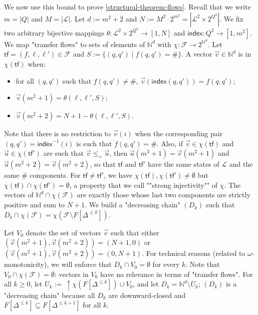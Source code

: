 \documentclass[10pt,a4paper]{article}
\let\mathbb\mathds
\renewcommand{\geq}{\geqslant}
\renewcommand{\leq}{\leqslant}
\newcommand{\nats}{\mathbb{N}}
\newcommand{\set}[1]{\{#1\}}
\newcommand{\nset}[2]{[#1,#2]}
\newcommand{\deff}{:=}
\newcommand{\size}[1]{|#1|}
\newcommand{\transitions}{\Delta}
\newcommand*{\states}{Q}
\newcommand{\bstates}{\mathcal{L}}
\newcommand*{\abuchistate}{\ell}
\newcommand*{\bstate}{\abuchistate}
\let\olduparrow\uparrow
\renewcommand*{\uparrow}{{\,\olduparrow}}
\newcommand*{\upwardclosure}[1]{\uparrow #1}
\newcommand*{\dummysymb}{\#}
\newcommand*{\transferflows}{\mathcal{F}}
\newcommand*{\transfersof}[1]{F[#1]}
\newcommand*{\atf}{\mathsf{tf}}
\newcommand*{\zerovectors}{V_0}
\newcommand*{\leprod}{\leq_{\times}}
\newcommand*{\finitemapping}{\theta}
\newcommand*{\mapencoding}{\chi}
\newcommand*{\relevantvectors}{\mapencoding(\transferflows)}
\newcommand*{\indexof}{\mathsf{index}}
\begin{document}
%
We now use this bound to prove \cref{structural-theorem-flows}.
Recall that we write \(m = \size{\states}\) and \(M = \size{\bstates}\).
Let \(d \deff m^2 + 2\) and \(N \deff M^2 \cdot 2^{m^2} = \size{\bstates^2 \times 2^{\states^2}}\).
We fix two arbitrary bijective mappings \(\finitemapping: \bstates^2 \times 2^{\states^2} \to \nset{1}{N}\) and \(\indexof:\states^2 \to \nset{1}{m^2}\).
We map "transfer flows" to sets of elements of \(\nats^d\) with \(\mapencoding: \transferflows \to 2^{\nats^d}\).
Let \(\atf = (f,\bstate, \bstate') \in \transferflows\) and \(S \deff \set{(q,q') \mid f(q,q') = \dummysymb}\).
A vector \(\vec{v} \in \nats^{d}\) is in \(\mapencoding(\atf)\) when:
\begin{itemize}[noitemsep,topsep=0pt,parsep=0pt,partopsep=0pt]
	\item for all \((q,q')\) such that \(f(q,q') \ne \dummysymb\), \(\vec{v}(\indexof(q,q')) = f(q,q')\);
	\item \(\vec{v}(m^2+1) = \finitemapping(\bstate, \bstate', S)\);
	\item \(\vec{v}(m^2+2) = N+1 -  \finitemapping(\bstate, \bstate', S)\).
\end{itemize}
Note that there is no restriction to \(\vec{v}(i)\) when the corresponding pair \((q,q') = \indexof^{-1}(i)\) is such that \(f(q,q') = \dummysymb\).
Also, if \(\vec{v} \in \mapencoding(\atf)\) and \(\vec{u} \in \mapencoding(\atf')\) are such that \(\vec{v} \leprod \vec{u}\), then \(\vec{u}(m^2+1) = \vec{v}(m^2+1)\) and \(\vec{u}(m^2+2) = \vec{v}(m^2+2)\), so that \(\atf\) and \(\atf'\) have the same states of \(\bstates\) and the same \(\dummysymb\) components.
For \(\atf \ne \atf'\), we have \(\mapencoding(\atf), \mapencoding(\atf') \ne \emptyset\) but \(\mapencoding(\atf) \cap \mapencoding(\atf') = \emptyset\), a property that we call ""strong injectivity"" of \(\mapencoding\).
The vectors of \(\nats^d \cap \mapencoding(\transferflows)\) are exactly those whose last two components are strictly positive and sum to \(N+1\).
We build a "decreasing chain" \((D_k)\) such that \(D_k \cap \mapencoding(\transferflows) = \mapencoding(\transferflows \setminus \transfersof{\transitions^{\leq k}})\).

Let \(\zerovectors\) denote the set of vectors \(\vec{v}\) such that either \((\vec{v}(m^2+1),\vec{v}(m^2+2))= (N+1,0)\) or \((\vec{v}(m^2+1),\vec{v}(m^2+2))= (0,N+1)\).
For technical reasons (related to \(\omega\)-monotonicity), we will enforce that \(D_k \cap \zerovectors = \emptyset\) for every \(k\).
Note that \(\zerovectors \cap \relevantvectors = \emptyset\): vectors in \(\zerovectors\) have no relevance in terms of "transfer flows".
For all \(k \geq 0\), let \(U_k\deff \upwardclosure{\mapencoding(\transfersof{\transitions^{\leq k}}) \cup \zerovectors}\), and let \(D_k = \nats^d \setminus U_k\); \((D_k)\) is a "decreasing chain" because all \(D_k\) are downward-closed and \(\transfersof{\transitions^{\leq k}} \subseteq \transfersof{\transitions^{\leq k+1}}\) for all \(k\).
%
%
\end{document}
